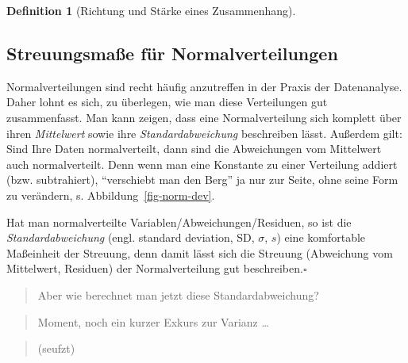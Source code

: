 \documentclass[
  a4paper,
  DIV=11]{scrreprt}
\theoremstyle{definition}
\theoremstyle{definition}
\theoremstyle{definition}
\newtheorem{definition}{Definition}[chapter]
\theoremstyle{remark}
\begin{document}
\begin{definition}[Richtung und Stärke eines
Zusammenhang]
\begin{figure}
\end{figure}%

\subsection{Streuungsmaße für
Normalverteilungen}\label{streuungsmauxdfe-fuxfcr-normalverteilungen}

Normalverteilungen sind recht häufig anzutreffen in der Praxis der
Datenanalyse. Daher lohnt es sich, zu überlegen, wie man diese
Verteilungen gut zusammenfasst. Man kann zeigen, dass eine
Normalverteilung sich komplett über ihren \emph{Mittelwert} sowie ihre
\emph{Standardabweichung} beschreiben lässt. Außerdem gilt: Sind Ihre
Daten normalverteilt, dann sind die Abweichungen vom Mittelwert auch
normalverteilt. Denn wenn man eine Konstante zu einer Verteilung addiert
(bzw. subtrahiert), ``verschiebt man den Berg'' ja nur zur Seite, ohne
seine Form zu verändern, s. Abbildung~\ref{fig-norm-dev}.

\begin{tcolorbox}[enhanced jigsaw, leftrule=.75mm, opacitybacktitle=0.6, colback=white, colframe=quarto-callout-note-color-frame, coltitle=black, colbacktitle=quarto-callout-note-color!10!white, opacityback=0, left=2mm, breakable, titlerule=0mm, toptitle=1mm, bottomtitle=1mm, rightrule=.15mm, title=\textcolor{quarto-callout-note-color}{\faInfo}\hspace{0.5em}{Hinweis}, arc=.35mm, bottomrule=.15mm, toprule=.15mm]

Hat man normalverteilte Variablen/Abweichungen/Residuen, so ist die
\emph{Standardabweichung} (engl. standard deviation, SD, \(\sigma\),
\(s\)) eine komfortable Maßeinheit der Streuung, denn damit lässt sich
die Streuung (Abweichung vom Mittelwert, Residuen) der Normalverteilung
gut beschreiben.\(\square\)

\end{tcolorbox}

\begin{quote}
{} Aber wie berechnet man jetzt diese Standardabweichung?
\end{quote}

\begin{quote}
{} Moment, noch ein kurzer Exkurs zur Varianz \ldots{}
\end{quote}

\begin{quote}
{} (seufzt)
\end{quote}


\end{definition}
\end{document}
